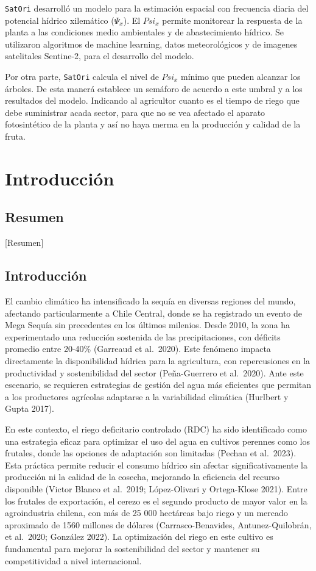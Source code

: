 \documentclass[
  letterpaper,
  DIV=11,
  numbers=noendperiod]{scrreprt}
\begin{document}
\texttt{SatOri} desarrolló un modelo para la estimación espacial con
frecuencia diaria del potencial hídrico xilemático (\(\Psi_x\)). El
\(Psi_x\) permite monitorear la respuesta de la planta a las condiciones
medio ambientales y de abastecimiento hídrico. Se utilizaron algoritmos
de machine learning, datos meteorológicos y de imagenes satelitales
Sentine-2, para el desarrollo del modelo.

Por otra parte, \texttt{SatOri} calcula el nivel de \(Psi_x\) mínimo que
pueden alcanzar los árboles. De esta manerá establece un semáforo de
acuerdo a este umbral y a los resultados del modelo. Indicando al
agricultor cuanto es el tiempo de riego que debe suministrar acada
sector, para que no se vea afectado el aparato fotosintético de la
planta y así no haya merma en la producción y calidad de la fruta.

\part{Introducción}

\chapter{Resumen}\label{resumen}

{[}Resumen{]}

\chapter{Introducción}\label{introducciuxf3n-1}

El cambio climático ha intensificado la sequía en diversas regiones del
mundo, afectando particularmente a Chile Central, donde se ha registrado
un evento de Mega Sequía sin precedentes en los últimos milenios. Desde
2010, la zona ha experimentado una reducción sostenida de las
precipitaciones, con déficits promedio entre 20-40\% (Garreaud et
al.~2020). Este fenómeno impacta directamente la disponibilidad hídrica
para la agricultura, con repercusiones en la productividad y
sostenibilidad del sector (Peña-Guerrero et al.~2020). Ante este
escenario, se requieren estrategias de gestión del agua más eficientes
que permitan a los productores agrícolas adaptarse a la variabilidad
climática (Hurlbert y Gupta 2017).

En este contexto, el riego deficitario controlado (RDC) ha sido
identificado como una estrategia eficaz para optimizar el uso del agua
en cultivos perennes como los frutales, donde las opciones de adaptación
son limitadas (Pechan et al.~2023). Esta práctica permite reducir el
consumo hídrico sin afectar significativamente la producción ni la
calidad de la cosecha, mejorando la eficiencia del recurso disponible
(Victor Blanco et al.~2019; López-Olivari y Ortega-Klose 2021). Entre
los frutales de exportación, el cerezo es el segundo producto de mayor
valor en la agroindustria chilena, con más de 25 000 hectáreas bajo
riego y un mercado aproximado de 1560 millones de dólares
(Carrasco-Benavides, Antunez-Quilobrán, et al.~2020; González 2022). La
optimización del riego en este cultivo es fundamental para mejorar la
sostenibilidad del sector y mantener su competitividad a nivel
internacional.
\end{document}
